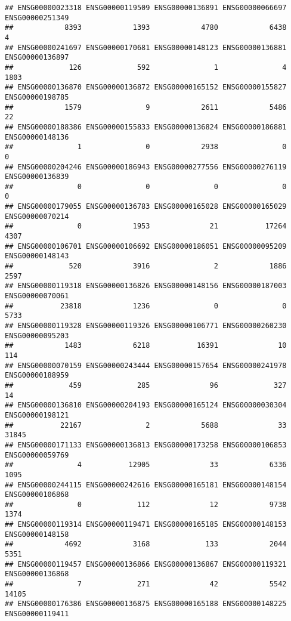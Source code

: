 \documentclass[
]{article}
\begin{document}
\begin{verbatim}
## ENSG00000023318 ENSG00000119509 ENSG00000136891 ENSG00000066697 ENSG00000251349 
##            8393            1393            4780            6438               4 
## ENSG00000241697 ENSG00000170681 ENSG00000148123 ENSG00000136881 ENSG00000136897 
##             126             592               1               4            1803 
## ENSG00000136870 ENSG00000136872 ENSG00000165152 ENSG00000155827 ENSG00000198785 
##            1579               9            2611            5486              22 
## ENSG00000188386 ENSG00000155833 ENSG00000136824 ENSG00000186881 ENSG00000148136 
##               1               0            2938               0               0 
## ENSG00000204246 ENSG00000186943 ENSG00000277556 ENSG00000276119 ENSG00000136839 
##               0               0               0               0               0 
## ENSG00000179055 ENSG00000136783 ENSG00000165028 ENSG00000165029 ENSG00000070214 
##               0            1953              21           17264            4307 
## ENSG00000106701 ENSG00000106692 ENSG00000186051 ENSG00000095209 ENSG00000148143 
##             520            3916               2            1886            2597 
## ENSG00000119318 ENSG00000136826 ENSG00000148156 ENSG00000187003 ENSG00000070061 
##           23818            1236               0               0            5733 
## ENSG00000119328 ENSG00000119326 ENSG00000106771 ENSG00000260230 ENSG00000095203 
##            1483            6218           16391              10             114 
## ENSG00000070159 ENSG00000243444 ENSG00000157654 ENSG00000241978 ENSG00000188959 
##             459             285              96             327              14 
## ENSG00000136810 ENSG00000204193 ENSG00000165124 ENSG00000030304 ENSG00000198121 
##           22167               2            5688              33           31845 
## ENSG00000171133 ENSG00000136813 ENSG00000173258 ENSG00000106853 ENSG00000059769 
##               4           12905              33            6336            1095 
## ENSG00000244115 ENSG00000242616 ENSG00000165181 ENSG00000148154 ENSG00000106868 
##               0             112              12            9738            1374 
## ENSG00000119314 ENSG00000119471 ENSG00000165185 ENSG00000148153 ENSG00000148158 
##            4692            3168             133            2044            5351 
## ENSG00000119457 ENSG00000136866 ENSG00000136867 ENSG00000119321 ENSG00000136868 
##               7             271              42            5542           14105 
## ENSG00000176386 ENSG00000136875 ENSG00000165188 ENSG00000148225 ENSG00000119411 

\end{verbatim}
\end{document}
